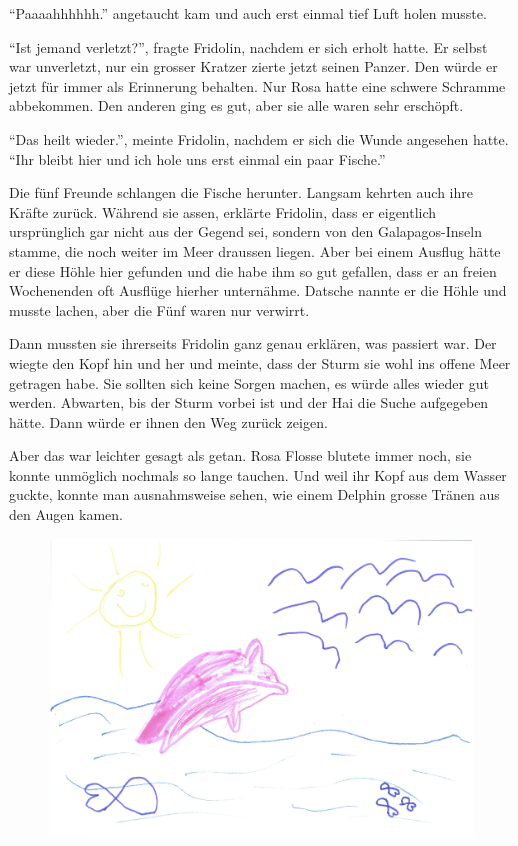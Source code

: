 \enquote{Paaaahhhhhh.} angetaucht kam und auch erst einmal tief Luft holen musste.

\enquote{Ist jemand verletzt?}, fragte Fridolin, nachdem er sich erholt hatte. Er selbst war unverletzt, nur ein grosser Kratzer zierte jetzt seinen Panzer. Den würde er jetzt für immer als Erinnerung behalten. Nur Rosa hatte eine schwere Schramme abbekommen. Den anderen ging es gut, aber sie alle waren sehr erschöpft.

\enquote{Das heilt wieder.}, meinte Fridolin, nachdem er sich die Wunde angesehen hatte. \enquote{Ihr bleibt hier und ich hole uns erst einmal ein paar Fische.}

Die fünf Freunde schlangen die Fische herunter. Langsam kehrten auch ihre Kräfte zurück. Während sie assen, erklärte Fridolin, dass er eigentlich ursprünglich gar nicht aus der Gegend sei, sondern von den Galapagos-Inseln stamme, die noch weiter im Meer draussen liegen. Aber bei einem Ausflug hätte er diese Höhle hier gefunden und die habe ihm so gut gefallen, dass er an freien Wochenenden oft Ausflüge hierher unternähme. Datsche nannte er die Höhle und musste lachen, aber die Fünf waren nur verwirrt. 

Dann mussten sie ihrerseits Fridolin ganz genau erklären, was passiert war. Der wiegte den Kopf hin und her und meinte, dass der Sturm sie wohl ins offene Meer getragen habe. Sie sollten sich keine Sorgen machen, es würde alles wieder gut werden. Abwarten, bis der Sturm vorbei ist und der Hai die Suche aufgegeben hätte. Dann würde er ihnen den Weg zurück zeigen.

Aber das war leichter gesagt als getan. Rosa Flosse blutete immer noch, sie konnte unmöglich nochmals so lange tauchen. Und weil ihr Kopf aus dem Wasser guckte, konnte man ausnahmsweise sehen, wie einem Delphin grosse Tränen aus den Augen kamen.

\begin{figure}[h]
\centering
\includegraphics[width=.7\textwidth]{bilder/oma1.pdf}
\end{figure}

